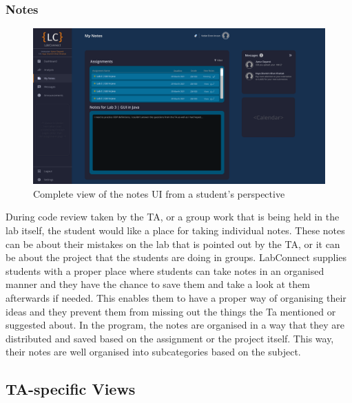 \documentclass[a4paper, 12pt]{article}
\begin{document}
    \subsubsection{Notes}
    
    \begin{figure}[H]
        \centering
        \includegraphics[width=\textwidth]{student_notes}
        \caption{Complete view of the notes UI from a student's perspective}
        \label{fig:student_notes_full}
    \end{figure}
    
    
    
    
    
    
    During code review taken by the TA, or a group work that is being held in the lab itself,
    the student would like a place for taking individual notes. These notes can be about their
    mistakes on the lab that is pointed out by the TA, or it can be about the project that the 
    students are doing in groups. LabConnect supplies students with a proper place where students
    can take notes in an organised manner and they have the chance to save them and take a look
    at them afterwards if needed. This enables them to have a proper way of organising their ideas
    and they prevent them from missing out the things the Ta mentioned or suggested about. In the
    program, the notes are organised in a way that they are distributed and saved based on the 
    assignment or the project itself. This way, their notes are well organised into subcategories
    based on the subject.
    
    
    
    
    
    \pagebreak
    
    
    \subsection{TA-specific Views}
    
\end{document}
